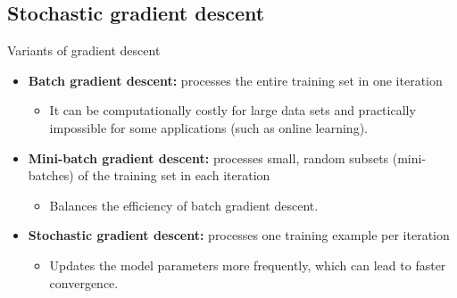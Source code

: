 \documentclass[serif, aspectratio=169]{beamer}
\begin{document}
\subsection{Stochastic gradient descent}

\begin{frame}{Variants of gradient descent}
    \begin{itemize}
        \item \textbf{Batch gradient descent:} processes the entire training set in one iteration
        \begin{itemize}
            \item It can be computationally costly for large data sets and practically impossible for some applications (such as online learning).
        \end{itemize}
        
        \item \textbf{Mini-batch gradient descent:} processes small, random subsets (mini-batches) of the training set in each iteration
        \begin{itemize}
            \item Balances the efficiency of batch gradient descent.
        \end{itemize}
        \item \textbf{Stochastic gradient descent:} processes one training example per iteration
        \begin{itemize}
            \item Updates the model parameters more frequently, which can lead to faster convergence.
        \end{itemize}
    \end{itemize}
    
    
\end{frame}
\end{document}
